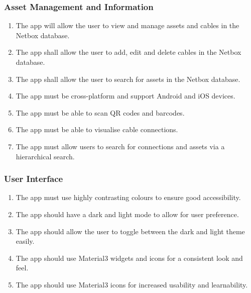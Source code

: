 \documentclass [11pt,a4paper]{article}
\begin{document}
\subsubsection{Asset Management and Information}
\label{sec:spec_asset}
\begin{enumerate}[label={\fbox{ASST\_SPEC\_\arabic*}}, leftmargin=*, labelindent=\parindent]
    \item The app will allow the user to view and manage assets and cables in the Netbox database. \label{spec_asset_1}
    \item The app shall allow the user to add, edit and delete cables in the Netbox database. \label{spec_asset_2}
    \item The app shall allow the user to search for assets in the Netbox database. \label{spec_asset_3}
    \item The app must be cross-platform and support Android and iOS devices. \label{spec_asset_4}
    \item The app must be able to scan QR codes and barcodes.  \label{spec_asset_5}
    \item The app must be able to visualise cable connections. \label{spec_asset_6}
    \item The app must allow users to search for connections and assets via a hierarchical search. \label{spec_asset_7}
\end{enumerate}

\subsubsection{User Interface}
\label{sec:spec_ui}
\begin{enumerate}[label={\fbox{INTF\_SPEC\_\arabic*}}, leftmargin=*, labelindent=\parindent]
    \item The app must use highly contrasting colours to ensure good accessibility. \label{spec_ui_1}
    \item The app should have a dark and light mode to allow for user preference. \label{spec_ui_2}
    \item The app should allow the user to toggle between the dark and light theme easily.  \label{spec_ui_3}
    \item The app should use Material3 widgets and icons for a consistent look and feel. \label{spec_ui_4}
    \item The app should use Material3 icons for increased usability and learnability. \label{spec_ui_5}
\end{enumerate}
\end{document}
